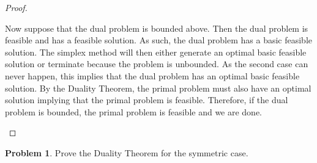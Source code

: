 \documentclass[12pt]{article}
\theoremstyle{definition}
\newtheorem{problem}{Problem}
\begin{document}
\begin{proof}
\begin{enumerate}
      Now suppose that the dual problem is bounded above. Then the dual problem
      is feasible and has a feasible solution. As such, the dual problem has a
      basic feasible solution. The simplex method will then either generate an
      optimal basic feasible solution or terminate because the problem is unbounded.
      As the second case can never happen, this implies that the dual problem has
      an optimal basic feasible solution. By the Duality Theorem, the primal
      problem must also have an optimal solution implying that the primal
      problem is feasible. Therefore, if the dual problem is bounded, the
      primal problem is feasible and we are done.
  \end{enumerate}

\end{proof}
\newpage


\begin{problem}
  Prove the Duality Theorem for the symmetric case.
\end{problem}
\end{document}
